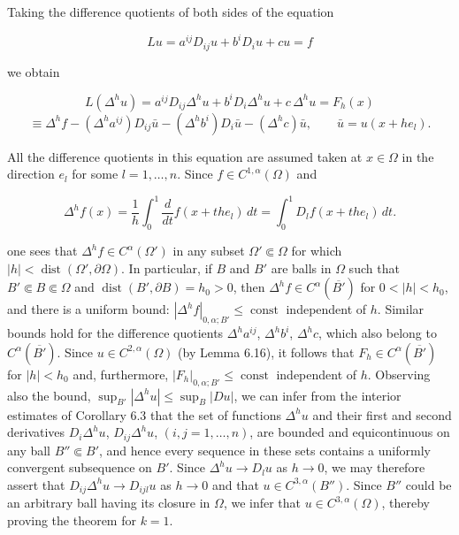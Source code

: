\begin{flushleft}
Taking the difference quotients of both sides of the equation
\end{flushleft}

\[
Lu = a^{ij}D_{ij}u + b^iD_i u + cu = f
\]

\begin{flushleft}
we obtain
\end{flushleft}

\begin{equation}
\tag{6.49}
L(\Delta^h u) = a^{ij}D_{ij}\Delta^h u + b^iD_i \Delta^h u + c\,\Delta^h u = F_h(x)
\end{equation}
\[
\equiv \Delta^h f - (\Delta^h a^{ij})D_{ij}\bar{u} - (\Delta^h b^i)D_i\bar{u} - (\Delta^h c)\bar{u},\qquad \bar{u}=u(x+he_l).
\]

\begin{flushleft}
All the difference quotients in this equation are assumed taken at $x\in\Omega$ in the direction $e_l$ for some $l=1,\ldots,n$. Since $f\in C^{1,\alpha}(\Omega)$ and
\end{flushleft}

\[
\Delta^h f(x)=\frac{1}{h}\int_0^1 \frac{d}{dt}f(x+the_l)\,dt
= \int_0^1 D_l f(x+the_l)\,dt.
\]

\begin{flushleft}
one sees that $\Delta^h f\in C^\alpha(\Omega')$ in any subset $\Omega' \Subset \Omega$ for which $|h|<\operatorname{dist}(\Omega',\partial\Omega)$. In particular, if $B$ and $B'$ are balls in $\Omega$ such that $B'\Subset B\Subset\Omega$ and $\operatorname{dist}(B',\partial B)=h_0>0$, then $\Delta^h f\in C^\alpha(\overline{B'})$ for $0<|h|<h_0$, and there is a uniform bound: $|\Delta^h f|_{0,\alpha;B'}\leq \operatorname{const}$ independent of $h$. Similar bounds hold for the difference quotients $\Delta^h a^{ij}$, $\Delta^h b^i$, $\Delta^h c$, which also belong to $C^\alpha(\overline{B'})$. Since $u\in C^{2,\alpha}(\Omega)$ (by Lemma 6.16), it follows that $F_h\in C^\alpha(\overline{B'})$ for $|h|<h_0$ and, furthermore, $|F_h|_{0,\alpha;B'}\leq \operatorname{const}$ independent of $h$. Observing also the bound, $\sup_{B'}|\Delta^h u|\leq \sup_B |Du|$, we can infer from the interior estimates of Corollary 6.3 that the set of functions $\Delta^h u$ and their first and second derivatives $D_i\Delta^h u$, $D_{ij}\Delta^h u$, $(i,j=1,\ldots,n)$, are bounded and equicontinuous on any ball $B''\Subset B'$, and hence every sequence in these sets contains a uniformly convergent subsequence on $B'$. Since $\Delta^h u\to D_lu$ as $h\to0$, we may therefore assert that $D_{ij}\Delta^h u\to D_{ijl}u$ as $h\to0$ and that $u\in C^{3,\alpha}(B'')$. Since $B''$ could be an arbitrary ball having its closure in $\Omega$, we infer that $u\in C^{3,\alpha}(\Omega)$, thereby proving the theorem for $k=1$.
\end{flushleft}


